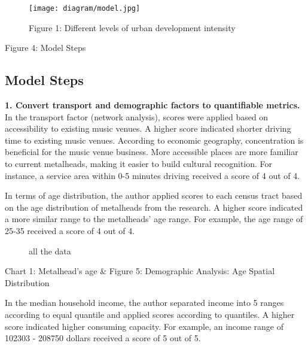 \documentclass[11pt]{article}
\begin{document}
\begin{figure}[H]
\begin{center}
\centering
\texttt{[image: diagram/model.jpg]}
\caption{Figure 1: Different levels of urban development intensity}
\label{fig:figure1}
\end{center}
\end{figure}

\begin{center}
\centering
Figure 4: Model Steps
\end{center}

\subsection{Model Steps}


\textbf{1. Convert transport and demographic factors to quantifiable metrics.}\\
In the transport factor (network analysis), scores were applied based on accessibility to existing music venues. A higher score indicated shorter driving time to existing music venues. According to economic geography, concentration is beneficial for the music venue business. More accessible places are more familiar to current metalheads, making it easier to build cultural recognition. For instance, a service area within 0-5 minutes driving received a score of 4 out of 4.

In terms of age distribution, the author applied scores to each census tract based on the age distribution of metalheads from the research. A higher score indicated a more similar range to the metalheads’ age range. For example, the age range of 25-35 received a score of 4 out of 4.


\begin{figure}[H] 
    \centering
    \hfill%
    \caption{all the data}
\end{figure}

\begin{center}
\centering
Chart 1: Metalhead's age  \& Figure 5: Demographic Analysis: Age Spatial Distribution
\end{center}

In the median household income, the author separated income into 5 ranges according to equal quantile and applied scores according to quantiles. A higher score indicated higher consuming capacity. For example, an income range of 102303 - 208750 dollars received a score of 5 out of 5.
\end{document}
